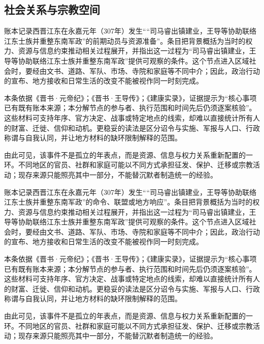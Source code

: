 \subsection{社会关系与宗教空间}

账本记录西晋江东在永嘉元年（307年）发生““司马睿出镇建业，王导等协助联络江东士族并重整东南军政”的前期动员与资源准备”。条目把背景概括为当时的权力、资源与信息约束推动相关过程展开，并指出这一过程为“司马睿出镇建业，王导等协助联络江东士族并重整东南军政”提供可观察的条件。这个节点进入区域社会时，要经由文书、道路、军队、市场、寺院和家庭等不同中介；因此，政治行动的宣布、地方接收和日常生活的改变不能被视作同一时刻完成。

本条依据《晋书·元帝纪》；《晋书·王导传》；《建康实录》，证据提示为“核心事项已有既有账本来源；本分解节点的参与者、执行范围和时间先后仍须逐案核验”。这些材料可支持年序、官方决定、战事或特定地点的线索，却难以直接统计所有人的财富、迁徙、信仰和动机。更稳妥的读法是区分诏令与实施、军报与人口、行政称谓与自我认同，并让地方材料的缺环限制解释的范围。

由此可见，该事件不是孤立的年表点，而是资源、信息与权力关系重新配置的一环。不同地区的官员、社群和家庭可能以不同方式承担征发、保护、迁移或宗教活动；现存来源只能照亮其中一部分，不能替沉默者制造统一的经验。

账本记录西晋江东在永嘉元年（307年）发生““司马睿出镇建业，王导等协助联络江东士族并重整东南军政”的命令、联盟或地方响应”。条目把背景概括为当时的权力、资源与信息约束推动相关过程展开，并指出这一过程为“司马睿出镇建业，王导等协助联络江东士族并重整东南军政”提供可观察的条件。这个节点进入区域社会时，要经由文书、道路、军队、市场、寺院和家庭等不同中介；因此，政治行动的宣布、地方接收和日常生活的改变不能被视作同一时刻完成。

本条依据《晋书·元帝纪》；《晋书·王导传》；《建康实录》，证据提示为“核心事项已有既有账本来源；本分解节点的参与者、执行范围和时间先后仍须逐案核验”。这些材料可支持年序、官方决定、战事或特定地点的线索，却难以直接统计所有人的财富、迁徙、信仰和动机。更稳妥的读法是区分诏令与实施、军报与人口、行政称谓与自我认同，并让地方材料的缺环限制解释的范围。

由此可见，该事件不是孤立的年表点，而是资源、信息与权力关系重新配置的一环。不同地区的官员、社群和家庭可能以不同方式承担征发、保护、迁移或宗教活动；现存来源只能照亮其中一部分，不能替沉默者制造统一的经验。


